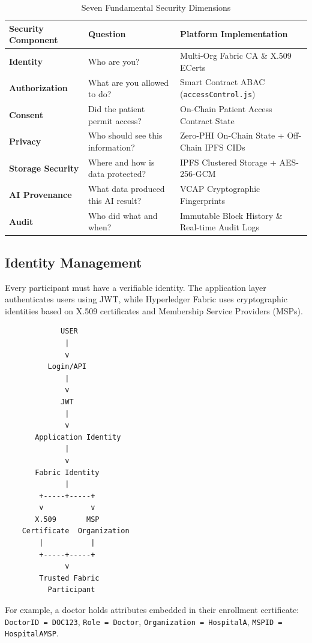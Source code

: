 \documentclass[11pt,a4paper]{article}
\begin{document}
\begin{table}[htbp]
\centering
\small
\begin{tabular}{@{}llp{8cm}@{}}
\toprule
\textbf{Security Component} & \textbf{Question} & \textbf{Platform Implementation} \\ \midrule
\textbf{Identity} & Who are you? & Multi-Org Fabric CA \& X.509 ECerts \\
\textbf{Authorization} & What are you allowed to do? & Smart Contract ABAC (\texttt{accessControl.js}) \\
\textbf{Consent} & Did the patient permit access? & On-Chain Patient Access Contract State \\
\textbf{Privacy} & Who should see this information? & Zero-PHI On-Chain State + Off-Chain IPFS CIDs \\
\textbf{Storage Security} & Where and how is data protected? & IPFS Clustered Storage + AES-256-GCM \\
\textbf{AI Provenance} & What data produced this AI result? & VCAP Cryptographic Fingerprints \\
\textbf{Audit} & Who did what and when? & Immutable Block History \& Real-time Audit Logs \\ \bottomrule
\end{tabular}
\caption{Seven Fundamental Security Dimensions}
\end{table}

\subsection{Identity Management}
Every participant must have a verifiable identity. The application layer authenticates users using JWT, while Hyperledger Fabric uses cryptographic identities based on X.509 certificates and Membership Service Providers (MSPs).

\begin{lstlisting}
             USER
              |
              v
          Login/API
              |
              v
             JWT
              |
              v
       Application Identity
              |
              v
       Fabric Identity
              |
        +-----+-----+
        v           v
       X.509       MSP
    Certificate  Organization
        |           |
        +-----+-----+
              v
        Trusted Fabric
          Participant
\end{lstlisting}

For example, a doctor holds attributes embedded in their enrollment certificate: \texttt{DoctorID = DOC123}, \texttt{Role = Doctor}, \texttt{Organization = HospitalA}, \texttt{MSPID = HospitalAMSP}.
\end{document}
